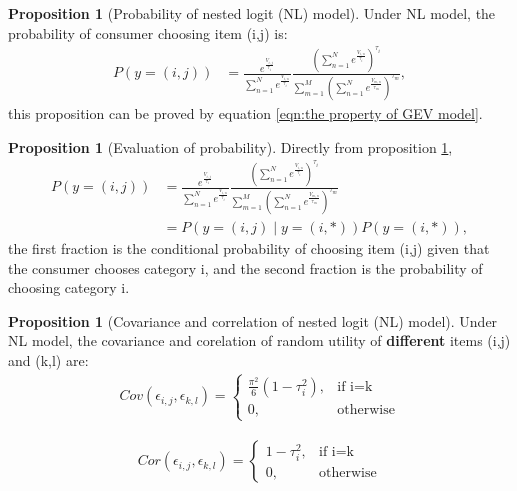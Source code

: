 \documentclass[12pt]{article}
\theoremstyle{definition}
\newtheorem{prop}[theorem]{Proposition}
\begin{document}
\begin{sloppypar}
\begin{prop}[Probability of nested logit (NL) model]\label{prop:1}
    Under NL model, the probability of consumer choosing item (i,j) is:
    \begin{align*}
        P(y=(i,j)) &= \frac{e^\frac{{V_{i,j}}}{\tau_i}}{\sum_{n=1}^{N} e^\frac{{V_{i,n}}}{\tau_i}} \frac{(\sum_{n=1}^{N} e^\frac{{V_{i,n}}}{\tau_i})^{\tau_i}}{\sum_{m=1}^{M}(\sum_{n=1}^{N} e^\frac{{V_{m,n}}}{\tau_m})^{\tau_m}},
    \end{align*}
    this proposition can be proved by equation \ref{eqn:the property of GEV model}.
\end{prop}

\begin{prop}[Evaluation of probability]\label{prop:2}
    Directly from proposition \ref{prop:1}, 
    \begin{align*}
        P(y=(i,j)) 
        &= \frac{e^\frac{{V_{i,j}}}{\tau_i}}{\sum_{n=1}^{N} e^\frac{{V_{i,n}}}{\tau_i}} \frac{(\sum_{n=1}^{N} e^\frac{{V_{i,n}}}{\tau_i})^{\tau_i}}{\sum_{m=1}^{M}(\sum_{n=1}^{N} e^\frac{{V_{m,n}}}{\tau_m})^{\tau_m}}\\
        &= P(y=(i,j) \mid y=(i,*))P(y=(i,*)),
    \end{align*}
    the first fraction is the conditional probability of choosing item (i,j) given that the consumer chooses category i, and the second fraction is the probability of choosing category i.
\end{prop}

\begin{prop}[Covariance and correlation of nested logit (NL) model]\label{prop:3}
    Under NL model, the covariance and corelation of random utility of \textbf{different} items (i,j) and (k,l) are:
    \begin{align*}
        Cov(\epsilon_{i,j}, \epsilon_{k,l}) = 
        \begin{cases}
            \frac{\pi^2}{6}(1-\tau_i^2), & \text{if i=k} \\
            0, & \text{otherwise}
        \end{cases}
    \end{align*}

    \begin{align*}
        Cor(\epsilon_{i,j}, \epsilon_{k,l}) =
        \begin{cases}
            1-\tau_i^2, & \text{if i=k} \\
            0, & \text{otherwise}
        \end{cases}
    \end{align*}
\end{prop}


\end{sloppypar}
\end{document}

